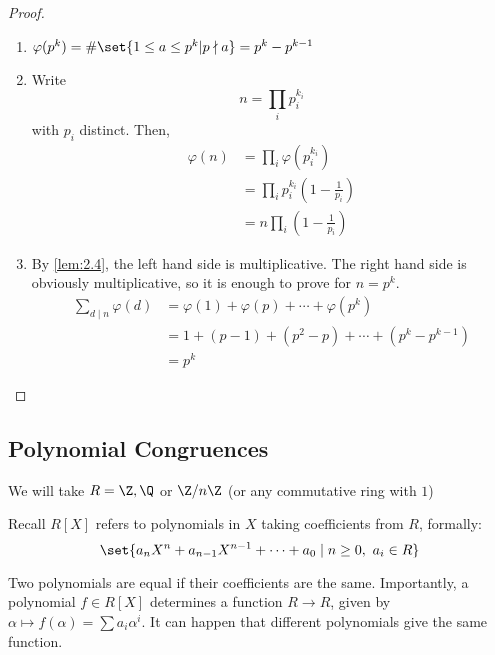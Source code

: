 \documentclass{article}
\begin{document}
\begin{proof}
    \leavevmode
    \begin{enumerate}[label=(\roman*)]
        \item $\varphi (p^k) = \# \set{ 1 \leq a \leq p^k | p \nmid a } = p^k - p^{k-1}$
        \item Write
            \begin{equation*}
                n = \prod_i p_i^{k_i}
            \end{equation*}
            with $p_i$ distinct. Then,
            \begin{align*}
                \varphi (n) &= \prod_i \varphi (p_i^{k_i}) \\%
                            &= \prod_i p_i^{k_i} \left(1 - \frac{1}{p_i}\right) \\
                            &= n \prod_i \left(1 - \frac{1}{p_i} \right)
            \end{align*}
        \item By \cref{lem:2.4}, the left hand side is multiplicative. The right hand side is obviously multiplicative, so it is enough to prove for $n = p^k$.
            \begin{align*}
                \sum_{d \mid n} \varphi(d) &= \varphi(1) + \varphi(p) + \dotsb + \varphi(p^k) \\
                                       &= 1 + (p - 1) + (p^2 - p) + \dotsb + (p^k - p^{k-1}) \\
                                       &= p^k
            \end{align*}
    \end{enumerate}
\end{proof}

\subsection{Polynomial Congruences}

We will take $R = \Z, \Q$ or $\Z/n\Z$ (or any commutative ring with $1$)

Recall $R[X]$ refers to polynomials in $X$ taking coefficients from $R$, formally:
\begin{equation*}
    \set{a_n X^n + a_{n-1} X^{n-1} + \dots + a_0 \mid n \geq 0, \ a_i \in R}
\end{equation*}

Two polynomials are equal if their coefficients are the same.
Importantly, a polynomial $f \in R[X]$ determines a function $R \to R$, given by $\alpha \mapsto f(\alpha) = \sum a_i \alpha^i$.
It can happen that different polynomials give the same function.
\end{document}
